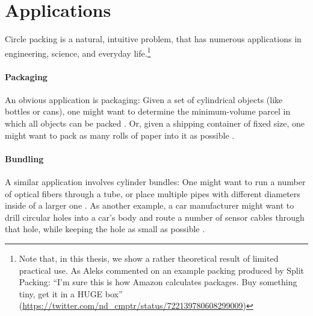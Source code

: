 \documentclass[a4paper,style=print,oneside,bibliography=totoc,nexus,lnum,extramargin]{tubsbook}
\begin{document}
%
%
%

\section{Applications}

Circle packing is a natural, intuitive problem, that has numerous applications in engineering, science, and everyday life.\footnote{Note that, in this thesis, we show a rather theoretical result of limited practical use. As Aleks commented on an example packing produced by Split Packing: “I'm sure this is how Amazon calculates packages. Buy something tiny, get it in a HUGE box” (\url{https://twitter.com/nd_cmptr/status/722139780608299009})}

\paragraph{Packaging}

An obvious application is packaging: Given a set of cylindrical objects (like bottles or cans), one might want to determine the minimum-volume parcel in which all objects can be packed \parencite{CKP2008solving}. Or, given a shipping container of fixed size, one might want to pack as many rolls of paper into it as possible \parencite{fraser1994integrated}.

\paragraph{Bundling}

A similar application involves cylinder bundles:
One might want to run a number of optical fibers through a tube, or place multiple pipes with different diameters inside of a larger one \parencite{WHZX2002improved}. As another example, a car manufacturer might want to drill circular holes into a car's body and route a number of sensor cables through that hole, while keeping the hole as small as possible \cite{SSSKK2004disk}.
\end{document}
